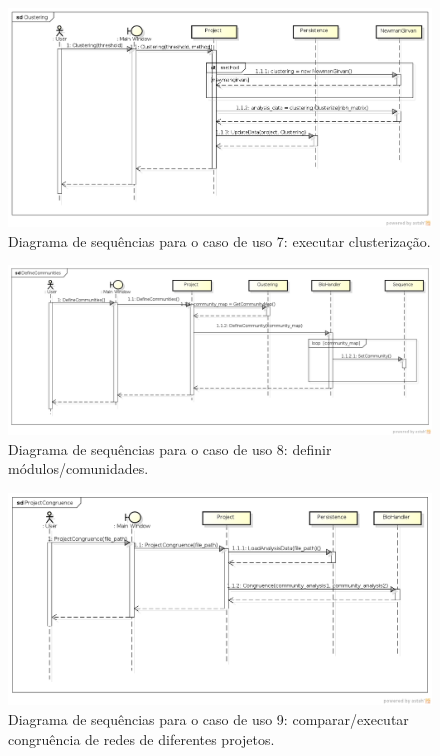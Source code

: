 \begin{figure}
\centering
\includegraphics[scale=0.47]{clustering}
\caption{Diagrama de sequências para o caso de uso 7: executar clusterização.}
\label{fig:clustering}
\end{figure}

\begin{figure}
\centering
\includegraphics[scale=0.41]{define-communities}
\caption{Diagrama de sequências para o caso de uso 8: definir módulos/comunidades.}
\label{fig:define-communities}
\end{figure}

\begin{figure}
\centering
\includegraphics[scale=0.47]{project-congruence}
\caption{Diagrama de sequências para o caso de uso 9: comparar/executar congruência de redes de diferentes projetos.}
\label{fig:project-congruence}
\end{figure}

